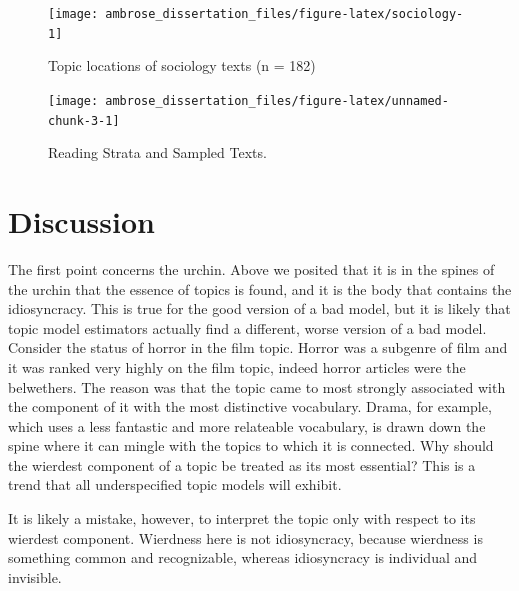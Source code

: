 \documentclass[]{book}
\theoremstyle{definition}
\theoremstyle{definition}
\theoremstyle{definition}
\theoremstyle{remark}
\begin{document}
\begin{figure}

{\centering \texttt{[image: ambrose\_dissertation\_files/figure-latex/sociology-1]} 

}

\caption{Topic locations of sociology texts (n = 182)}\label{fig:sociology}
\end{figure}

\begin{figure}

{\centering \texttt{[image: ambrose\_dissertation\_files/figure-latex/unnamed-chunk-3-1]} 

}

\caption{Reading Strata and Sampled Texts.}\label{fig:unnamed-chunk-3}
\end{figure}

\hypertarget{discussion}{%
\section{Discussion}\label{discussion}}

The first point concerns the urchin. Above we posited that it is in the
spines of the urchin that the essence of topics is found, and it is the
body that contains the idiosyncracy. This is true for the good version
of a bad model, but it is likely that topic model estimators actually
find a different, worse version of a bad model. Consider the status of
horror in the film topic. Horror was a subgenre of film and it was
ranked very highly on the film topic, indeed horror articles were the
belwethers. The reason was that the topic came to most strongly
associated with the component of it with the most distinctive
vocabulary. Drama, for example, which uses a less fantastic and more
relateable vocabulary, is drawn down the spine where it can mingle with
the topics to which it is connected. Why should the wierdest component
of a topic be treated as its most essential? This is a trend that all
underspecified topic models will exhibit.

It is likely a mistake, however, to interpret the topic only with
respect to its wierdest component. Wierdness here is not idiosyncracy,
because wierdness is something common and recognizable, whereas
idiosyncracy is individual and invisible.


\end{document}
